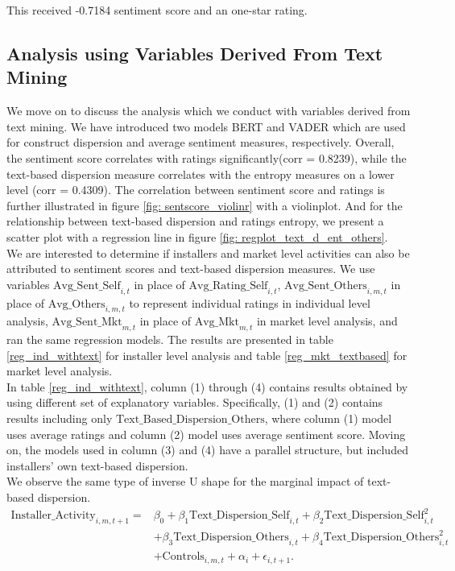 \documentclass[msom,blindrev]{informs3}
\begin{document}
This received -0.7184 sentiment score and an one-star rating.

\subsection{Analysis using Variables Derived From Text Mining}
We move on to discuss the analysis which we conduct with variables derived from text mining. We have introduced two models BERT and VADER which are used for construct dispersion and average sentiment measures, respectively. Overall, the sentiment score correlates with ratings significantly(corr = 0.8239), while the text-based dispersion measure correlates with the entropy measures on a lower level (corr = 0.4309). The correlation between sentiment score and ratings is further illustrated in figure \ref{fig: sentscore_violinr} with a violinplot. And for the relationship between text-based dispersion and ratings entropy, we present a scatter plot with a regression line in figure \ref{fig: regplot_text_d_ent_others}. \\
We are interested to determine if installers and market level activities can also be attributed to sentiment scores and text-based dispersion measures. We use variables $\text{Avg\_Sent\_Self}_{i,t}$ in place of $\text{Avg\_Rating\_Self}_{i,t}$, $\text{Avg\_Sent\_Others}_{i,m,t}$ in place of $\text{Avg\_Others}_{i,m,t}$ to represent individual ratings in individual level analysis, $\text{Avg\_Sent\_Mkt}_{m,t}$ in place of $\text{Avg\_Mkt}_{m,t}$ in market level analysis, and ran the same regression models. The results are presented in table \ref{reg_ind_withtext} for installer level analysis and table \ref{reg_mkt_textbased} for market level analysis.  \\
In table \ref{reg_ind_withtext}, column (1) through (4) contains results obtained by using different set of explanatory variables. Specifically, (1) and (2) contains results including only $\text{Text\_Based\_Dispersion\_Others}$, where column (1) model uses average ratings and column (2) model uses average sentiment score. Moving on, the models used in column (3) and (4) have a parallel structure, but included installers' own text-based dispersion.  \\

We observe the same type of inverse U shape for the marginal impact of text-based dispersion. \\

\begin{align}  \nonumber
    \text{Installer\_Activity}_{i,m,t+1}=&\beta_{0}+\beta_{1} \text{Text\_Dispersion\_Self}_{i,t}+\beta_{2} \text{Text\_Dispersion\_Self}_{i,t}^ {2}
    \\ \nonumber
    &+\beta_{3} \text{Text\_Dispersion\_Others}_{i,t}  +\beta_{4}\text{Text\_Dispersion\_Others}_{i,t}^{2} \\ \label{model_ind_textbased}
    &+ \text{Controls}_{i,m,t}+ \alpha_{i} + \epsilon_{i,t+1}.
\end{align}
\end{document}
